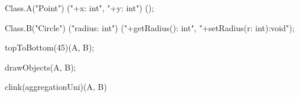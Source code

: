 Class.A("Point")
       ("+x: int",
        "+y: int") ();

Class.B("Circle")
       ("radius: int")
       ("+getRadius(): int",
        "+setRadius(r: int):void");

topToBottom(45)(A, B);

drawObjects(A, B);

clink(aggregationUni)(A, B)
